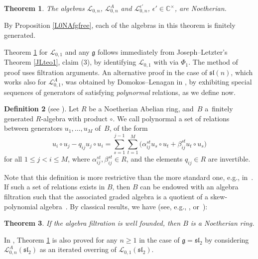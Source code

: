 \documentclass[11pt]{article}
\numberwithin{equation}{section}
\numberwithin{equation}{section}
\newtheorem{teo}{Theorem}[section]
\theoremstyle{definition}
\newtheorem{defi}[teo]{Definition}
\newcommand{\ep}{{\epsilon'}}
\newcommand{\mc}{\mathbb{C}}
\newcommand{\Ll}{{\mathcal L}}
\begin{document}
\begin{teo} \label{LonNoeth} The algebras ${\mathcal L}_{0,n}$, $\Ll_{0,n}^A$ and $\Ll_{0,n}^\ep$, $\ep\in \mc^\times$, are Noetherian.
\end{teo}

By Proposition \ref{L0NAfgfree}, each of the algebras in this theorem is finitely generated.

Theorem \ref{LonNoeth} for ${\mathcal L}_{0,1}$ and any $\mathfrak{g}$ follows immediately from Joseph--Letzter's Theorem \ref{JLteo1}, claim (3), by identifying ${\mathcal L}_{0,1}$ with  via $\Phi_1$. The method of proof uses filtration arguments. An alternative proof in the case of $\mathfrak{sl}(n)$, which works also for ${\mathcal L}_{0,1}^A$, was obtained by Domokos--Lenagan in \cite{DomLen}, by exhibiting special sequences of generators of  satisfying {\it polynormal} relations, as we define now.

\begin{defi}[{see \cite[Proposition 3.133]{VY}}] Let $R$ be a Noetherian Abelian ring, and~$B$ a~finitely generated $R$-algebra with product $\circ$. We call polynormal a set of relations between generators $u_1,\dots,u_M$ of~$B$, of the form{\samepage
\begin{equation}\label{echangegrad++}
u_i\circ u_j - q_{ij} u_j\circ u_i = \sum_{s=1}^{j-1}\sum_{t=1}^M \bigl(\alpha_{ij}^{st} u_s\circ u_t + \beta_{ij}^{st} u_t\circ u_s\bigr)
\end{equation}
for all $1\leq j<i\leq M$, where $\alpha_{ij}^{st}, \beta_{ij}^{st} \in R$, and the elements $q_{ij}\in R$ are invertible.}
\end{defi}
Note that this definition is more restrictive than the more standard one, e.g., in~\cite[Definition~II.4.1]{BG}. If such a set of relations exists in $B$, then $B$ can be endowed with an algebra filtration such that the associated graded algebra is a quotient of a skew-polynomial algebra~\cite[Proposition I.8.17]{BG}. By classical results, we have (see, e.g., \cite[Theorems~1.2.9, 1.6.9 and Examples~1.6.11]{MC-R}, or~\cite[Lemmas~3.130--3.131]{VY}):

\begin{teo} If the algebra filtration is well founded, then $B$ is a Noetherian ring.
\end{teo}

In \cite{DomLen}, Theorem \ref{LonNoeth} is also proved for any $n\geq 1$ in the case of $\mathfrak{g}={\mathfrak{sl}_2}$ by considering~$\Ll_{0,n}^A({\mathfrak{sl}_2})$ as an iterated overring of ${\mathcal L}_{0,1}({\mathfrak{sl}_2})$.
\end{document}
